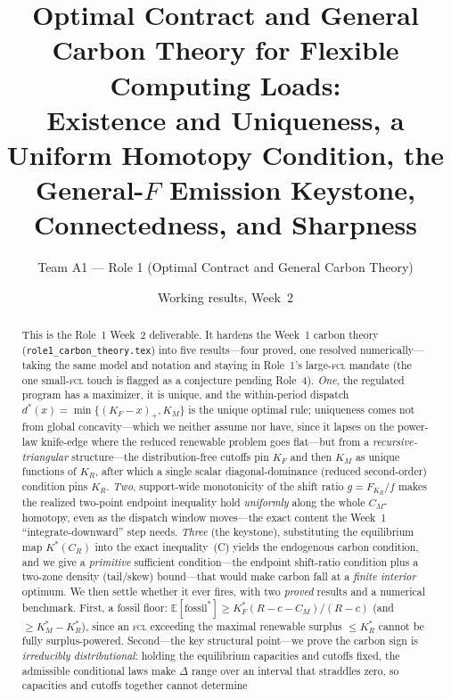 \documentclass[11pt,reqno]{amsart}
\theoremstyle{plain}
\theoremstyle{definition}
\theoremstyle{remark}
\newcommand{\KR}{K_R}
\newcommand{\KF}{K_F}
\newcommand{\KM}{K_M}
\newcommand{\KRs}{K_R^{*}}
\newcommand{\KFs}{K_F^{*}}
\newcommand{\KMs}{K_M^{*}}
\newcommand{\CM}{C_M}
\newcommand{\CR}{C_R}
\newcommand{\FKR}{F_{\!\KR}}
\newcommand{\E}{\mathbb{E}}
\begin{document}
\title[Optimal Contract and General Carbon Theory (Week 2)]
{Optimal Contract and General Carbon Theory for Flexible Computing Loads:\\
Existence and Uniqueness, a Uniform Homotopy Condition, the\\
General-$F$ Emission Keystone, Connectedness, and Sharpness}
\author{Team A1 --- Role 1 (Optimal Contract and General Carbon Theory)}
\date{Working results, Week~2}

\begin{abstract}
This is the Role~1 Week~2 deliverable. It hardens the Week~1 carbon theory
(\texttt{role1\_carbon\_theory.tex}) into five results---four proved, one resolved
numerically---taking the same model and notation and staying in Role~1's
large-\textsc{fcl} mandate (the one small-\textsc{fcl} touch is flagged as a
conjecture pending Role~4). \emph{One},
the regulated program has a maximizer, it is unique, and the within-period
dispatch $d^{*}(x)=\min\{(\KF-x)_+,\KM\}$ is the unique optimal rule; uniqueness
comes not from global concavity---which we neither assume nor have, since it lapses
on the power-law knife-edge where the reduced renewable problem goes flat---but
from a \emph{recursive-triangular} structure---the distribution-free
cutoffs pin $\KF$ and then $\KM$ as unique functions of $\KR$, after which a
single scalar diagonal-dominance (reduced second-order) condition pins $\KR$.
\emph{Two}, support-wide monotonicity of the shift ratio
$g=\FKR/f$ makes the realized two-point endpoint inequality hold \emph{uniformly}
along the whole $\CM$-homotopy, even as the dispatch window moves---the exact
content the Week~1 ``integrate-downward'' step needs. \emph{Three} (the
keystone), substituting the equilibrium map $K^{*}(\CR)$ into the exact
inequality~(C) yields the endogenous carbon condition, and we give a
\emph{primitive} sufficient condition---the endpoint shift-ratio condition plus a
two-zone density (tail/skew) bound---that would make carbon fall at a
\emph{finite interior} optimum. We then settle whether it ever fires, with two
\emph{proved} results and a numerical benchmark. First, a fossil floor:
$\E[\text{fossil}^{*}]\ge\KFs(R-c-\CM)/(R-c)$ (and $\ge\KMs-\KRs$), since an
\textsc{fcl} exceeding the maximal renewable surplus $\le\KRs$ cannot be fully
surplus-powered. Second---the key structural point---we prove the carbon sign is
\emph{irreducibly distributional}: holding the equilibrium capacities and cutoffs
fixed, the admissible conditional laws make $\Delta$ range over an interval that
straddles zero, so capacities and cutoffs together cannot determine

\end{abstract}
\end{document}
